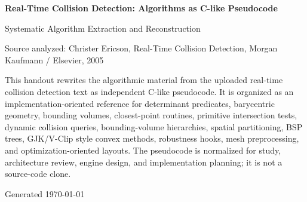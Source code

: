 \documentclass[10pt,letterpaper]{article}
\newcommand{\handouttitle}{Real-Time Collision Detection: Algorithms as C-like Pseudocode}
\begin{document}
\begin{titlepage}
\centering
\vspace*{0.85in}
{\Huge\bfseries\color{HouseBlue}\handouttitle\par}
\vspace{0.22in}
{\Large Systematic Algorithm Extraction and Reconstruction\par}
\vspace{0.34in}
{\large Source analyzed: Christer Ericson, Real-Time Collision Detection, Morgan Kaufmann / Elsevier, 2005\par}
\vfill
\begin{minipage}{0.88\textwidth}
\small
This handout rewrites the algorithmic material from the uploaded real-time collision detection text as independent C-like pseudocode. It is organized as an implementation-oriented reference for determinant predicates, barycentric geometry, bounding volumes, closest-point routines, primitive intersection tests, dynamic collision queries, bounding-volume hierarchies, spatial partitioning, BSP trees, GJK/V-Clip style convex methods, robustness hooks, mesh preprocessing, and optimization-oriented layouts. The pseudocode is normalized for study, architecture review, engine design, and implementation planning; it is not a source-code clone.
\end{minipage}
\vfill
{\large Generated \today\par}
\end{titlepage}
\clearpage
{}
\tableofcontents
\clearpage
{}
\end{document}
